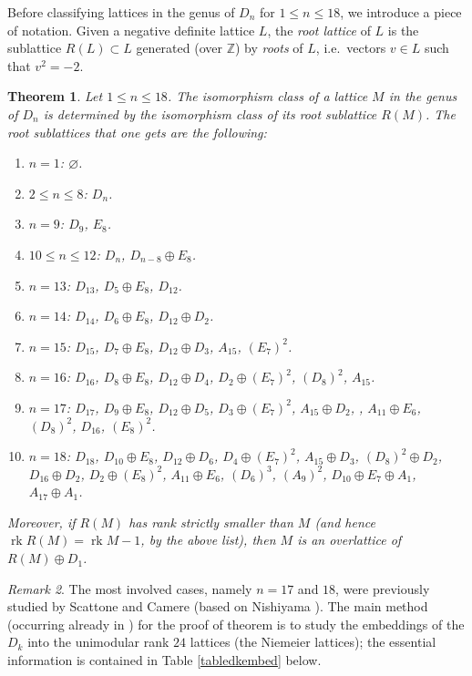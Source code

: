 \documentclass[11pt]{amsart}
\numberwithin{equation}{section}
\theoremstyle{plain}
\newtheorem{theorem}{Theorem}[section]
\theoremstyle{remark}
\newtheorem{remark}[theorem]{Remark}
\theoremstyle{definition}
\newcommand{\es}{\varnothing}
\newcommand{\ZZ}{{\mathbb Z}}
\DeclareMathOperator{\rk}{rk}
\begin{document}
Before classifying lattices in the genus of $D_n$ for $1\le n\le 18$, we introduce a piece of notation. Given a negative definite lattice $L$, the \emph{root lattice} of $L$ is the  sublattice  $R(L)\subset L$ generated (over $\ZZ$) by \emph{roots} of $L$, i.e.~vectors $v\in L$ such that $v^2=-2$. 
%
\begin{theorem}\label{thm:classifydn}
%
Let $1\le n\le 18$. The isomorphism class of a lattice $M$ in the genus  of $D_n$ is determined
 by the isomorphism class of its root sublattice $R(M)$.  
The root sublattices that one gets are the following:
%
\begin{enumerate}
%
\item
%
$n=1$: $\es$.
%
\item
%
$2\le n\le 8$: $D_n$.
% 
\item 
%
$n=9$: $D_9$, $E_8$.
% 
\item 
%
$10\le n \le 12$: $D_n$, $D_{n-8}\oplus E_8$.
%
\item 
%
$n=13$: $D_{13}$, $D_{5}\oplus E_8$, $D_{12}$.
%
\item 
%
$n=14$: $D_{14}$, $D_{6}\oplus E_8$, $D_{12}\oplus D_{2}$.
%
\item 
%
$n=15$: $D_{15}$, $D_7\oplus E_8$, $D_{12}\oplus D_3$,  $A_{15}$, $(E_7)^2$.
%
\item $n=16$: $D_{16}$, $D_8\oplus E_8$, $D_{12}\oplus D_4$, $D_2\oplus (E_7)^2$, $(D_8)^2$, $A_{15}$.
%
\item 
%
$n=17$: $D_{17}$, $D_9\oplus E_8$,  $D_{12}\oplus D_5$, $D_3\oplus(E_7)^2$, $A_{15}\oplus D_2$,  , $A_{11}\oplus E_6$,  $(D_8)^2$, $D_{16}$, $(E_8)^2$.
%
\item
%
 $n=18$: $D_{18}$, $D_{10}\oplus E_8$,  $D_{12}\oplus D_6$, $D_4\oplus (E_7)^2$, $A_{15}\oplus D_3$, $(D_8)^2\oplus D_2$, $D_{16}\oplus D_2$, 
 $D_2\oplus (E_8)^2$, $A_{11}\oplus E_6$, $(D_6)^3$, $(A_9)^2$, $D_{10}\oplus E_7\oplus A_1$, $A_{17}\oplus A_1$.
%
\end{enumerate}
%
Moreover, if $R(M)$ has rank strictly smaller than $M$ (and hence $\rk R(M)=\rk M-1$, by the above list), then $M$ is an overlattice of $R(M)\oplus D_1$. 
%
\end{theorem}

\begin{remark}
The most involved cases, namely $n=17$ and $18$, were previously studied by Scattone \cite[\S6.3]{scattone} and Camere \cite[Prop. 6.21]{camere} (based on Nishiyama \cite[Thm. 3.1]{nishiyama}). The main method (occurring already in \cite{scattone}) for the proof of theorem is to study the embeddings of the $D_k$ into the unimodular rank $24$ lattices (the Niemeier lattices); the essential information is contained in Table \ref{tabledkembed} below.
\end{remark}
\end{document}
